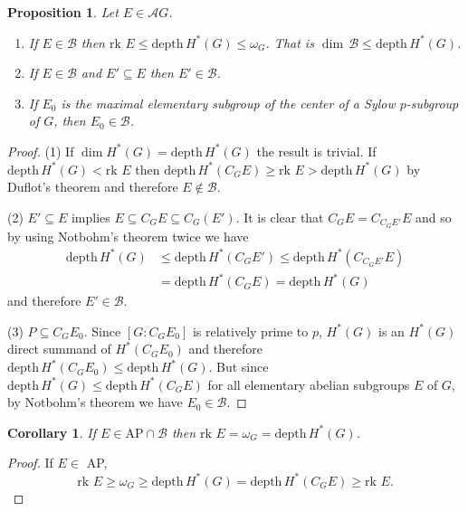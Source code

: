 \documentclass[reqno]{amsart}
\theoremstyle{plain}%
\newtheorem{prop}[thm]{Proposition}
\newtheorem{cor}[thm]{Corollary}
\theoremstyle{definition}
\theoremstyle{remark}
\newcommand\vv{\,\vert\,}
\newcommand\sub{\subseteq}
\newcommand\mc[1]{\mathcal #1}
\newcommand\dph{\text{depth}\,}
\newcommand\rk{\text{rk }}
\newcommand\p[1]{\frak p_{#1}}
\begin{document}
\begin{prop} Let $E\in\mc AG$.
\begin{enumerate}\item If $E\in\mc B$ then $\rk E\leq\dph H^*(G)\leq\omega _G$. That is $\dim\,\mc B\leq\dph H^*(G)$.
\item If $E\in\mc B$ and $E'\sub E$ then $E'\in\mc B$.
\item If $E_0$ is the maximal elementary subgroup of the center of a Sylow $p$-subgroup of $G$, then $E_0\in \mc B$.
\end{enumerate}\end{prop} 
\begin{proof}(1) If $\dim H^*(G)=\dph H^*(G)$ the result is trivial.  If $\dph H^*(G)<\rk E$ then $\dph H^*(C_GE)\geq \rk E>\dph H^*(G)$ by Duflot's theorem and therefore $E\notin\mc B$.
\par (2) $E'\sub E$ implies $E\sub C_GE\sub C_G(E')$. It is clear that $C_GE=C_{C_GE'}E$ and so by using Notbohm's theorem twice we have
\begin{equation*}\begin{split} \dph H^*(G)&\leq \dph H^*(C_GE')\leq\dph H^*(C_{C_GE'}E)\\&=\dph H^*(C_GE)=\dph H^*(G)\end{split}\end{equation*}
and therefore $E'\in\mc B$.
\par (3) $P\sub C_GE_0$. Since $[G:C_GE_0]$ is relatively prime to $p$, $H^*(G)$ is an $H^*(G)$ direct summand of $H^*(C_GE_0)$ and therefore $\dph H^*(C_GE_0)\leq\dph H^*(G)$.  But since $\dph H^*(G)\leq\dph H^*(C_GE)$ for all elementary abelian subgroups $E$ of $G$, by Notbohm's theorem we have $E_0\in\mc B$.\end{proof}

\begin{cor} If $E\in\text{AP}\cap\mc B$ then $\rk E=\omega_G=\dph H^*(G)$.\end{cor}
\begin{proof} If $E\in$ AP, 
$$\rk E\geq \omega_G\geq \dph H^*(G)=\dph H^*(C_GE)\geq \rk E.$$ \end{proof}



\end{document}
